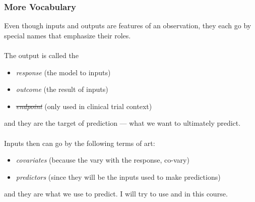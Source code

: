 \documentclass[slides]{beamer} %
\begin{document}
\begin{frame}\frametitle{More Vocabulary}

\small
Even though inputs and outputs are features of an observation, they each go by special names that emphasize their roles. \\~\\

The output is called the

\begin{itemize}
\item \textit{response} (the model  to inputs)
\item \textit{outcome} (the result of inputs)
\item \sout{\textit{endpoint}} (only used in clinical trial context)
\end{itemize}

and they are the target of prediction --- what we want to ultimately predict. \\~\\

Inputs then can go by the following terms of art:

\begin{itemize}
\item \textit{covariates} (because the vary with the response, co-vary)
\item \textit{predictors} (since they will be the inputs used to make predictions)
\end{itemize}

and they are what we use to predict. I will try to use  and  in this course.

\end{frame}
\end{document}
